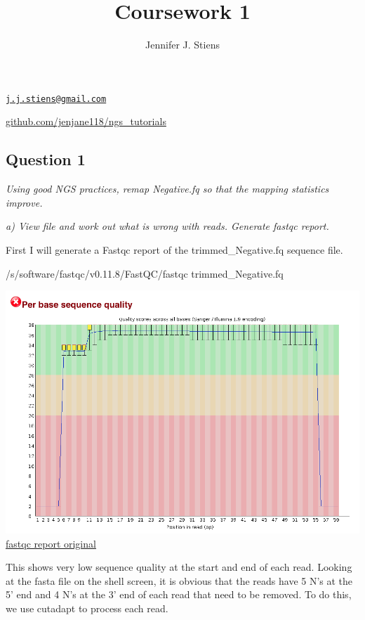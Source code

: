 \documentclass[12pt,]{article}
\title{Coursework 1}
\author{Jennifer J. Stiens}
\date{}
\newenvironment{Shaded}{\begin{snugshade}}{\end{snugshade}}
\newcommand{\ExtensionTok}[1]{#1}
\newcommand{\NormalTok}[1]{#1}
\begin{document}
\maketitle

\href{mailto:j.j.stiens@gmail.com}{\nolinkurl{j.j.stiens@gmail.com}}

\href{https://github.com/jenjane118/ngs_tutorials}{github.com/jenjane118/ngs\_tutorials}

\subsection{Question 1}\label{question-1}

\emph{Using good NGS practices, remap Negative.fq so that the mapping
statistics improve.}

\emph{a) View file and work out what is wrong with reads. Generate
fastqc report.}

First I will generate a Fastqc report of the trimmed\_Negative.fq
sequence file.

\begin{Shaded}
\begin{Highlighting}[]
\ExtensionTok{/s/software/fastqc/v0.11.8/FastQC/fastqc}\NormalTok{ trimmed_Negative.fq}
\end{Highlighting}
\end{Shaded}

\includegraphics{trimmed_Negative_fastqc.png}\\
\href{/d/projects/u/sj003/course_materials/fastq/coursework_1/trimmed_Negative_fastqc.html}{fastqc
report original}

This shows very low sequence quality at the start and end of each read.
Looking at the fasta file on the shell screen, it is obvious that the
reads have 5 N's at the 5' end and 4 N's at the 3' end of each read that
need to be removed. To do this, we use cutadapt to process each read.
\end{document}
